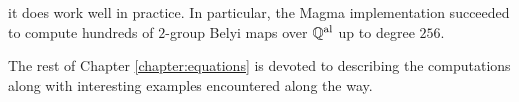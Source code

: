 \documentclass{dcthesis}
\newcommand{\QQal}{{\mathbb Q}^{\textup{al}}}
\numberwithin{equation}{section}
\theoremstyle{definition}
\theoremstyle{remark}
\begin{document}
{{{    it does work well in practice.
    In particular,
    the \textsf{Magma} implementation succeeded
    to compute hundreds of $2$-group Belyi maps
    over $\QQal$ up to degree $256$.
    \par
    The rest of Chapter \ref{chapter:equations}
    is devoted to describing the computations
    along with interesting examples
    encountered along the way.
  }
}}
\end{document}
